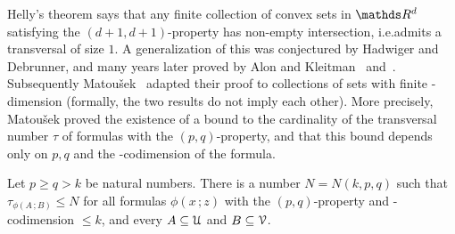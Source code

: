 \documentclass[scombinatorics.tex]{subfiles}
\begin{document}
Helly's theorem says that any finite collection of convex sets in $\RR^d$ satisfying the $(d + 1, d + 1)$-property has non-empty intersection, i.e.\@ admits a transversal of size $1$.
A generalization of this was conjectured by Hadwiger and Debrunner, and many
years later proved by Alon and Kleitman~\cite{AK1} and~\cite{AK2}.
Subsequently Matou\v{s}ek~\cite{matousek} adapted their proof to collections of sets with finite \vc-dimension (formally, the two results do not imply each other).
More precisely, Matou\v{s}ek proved the existence of a bound to the cardinality of the transversal number $\tau$ of {\nip} formulas with the $(p,q)$-property, and that this bound depends only on $p,q$ and the \vc-codimension of the formula.

\begin{theorem}
  Let $p\ge q> k$ be natural numbers.
  There is a number $N=N(k,p,q)$ such that 
  $\tau_{\phi(A\,;B)}\le N$ for all formulas $\phi(x\,;z)$ with the $(p,q)$-property and \vc-codimension $\le k$, and every $A\subseteq\EuScript U$ and $B\subseteq\EuScript V$.
\end{theorem}
\end{document}
